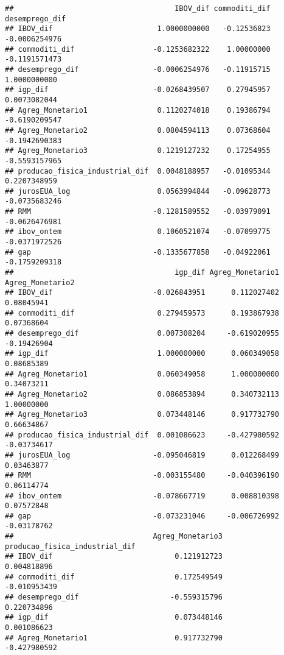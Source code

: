 \documentclass[
]{article}
\begin{document}
\begin{verbatim}
##                                     IBOV_dif commoditi_dif desemprego_dif
## IBOV_dif                        1.0000000000   -0.12536823  -0.0006254976
## commoditi_dif                  -0.1253682322    1.00000000  -0.1191571473
## desemprego_dif                 -0.0006254976   -0.11915715   1.0000000000
## igp_dif                        -0.0268439507    0.27945957   0.0073082044
## Agreg_Monetario1                0.1120274018    0.19386794  -0.6190209547
## Agreg_Monetario2                0.0804594113    0.07368604  -0.1942690383
## Agreg_Monetario3                0.1219127232    0.17254955  -0.5593157965
## producao_fisica_industrial_dif  0.0048188957   -0.01095344   0.2207348959
## jurosEUA_log                    0.0563994844   -0.09628773  -0.0735683246
## RMM                            -0.1281589552   -0.03979091  -0.0626476981
## ibov_ontem                      0.1060521074   -0.07099775  -0.0371972526
## gap                            -0.1335677858   -0.04922061  -0.1759209318
##                                     igp_dif Agreg_Monetario1 Agreg_Monetario2
## IBOV_dif                       -0.026843951      0.112027402       0.08045941
## commoditi_dif                   0.279459573      0.193867938       0.07368604
## desemprego_dif                  0.007308204     -0.619020955      -0.19426904
## igp_dif                         1.000000000      0.060349058       0.08685389
## Agreg_Monetario1                0.060349058      1.000000000       0.34073211
## Agreg_Monetario2                0.086853894      0.340732113       1.00000000
## Agreg_Monetario3                0.073448146      0.917732790       0.66634867
## producao_fisica_industrial_dif  0.001086623     -0.427980592      -0.03734617
## jurosEUA_log                   -0.095046819      0.012268499       0.03463877
## RMM                            -0.003155480     -0.040396190       0.06114774
## ibov_ontem                     -0.078667719      0.008810398       0.07572848
## gap                            -0.073231046     -0.006726992      -0.03178762
##                                Agreg_Monetario3 producao_fisica_industrial_dif
## IBOV_dif                            0.121912723                    0.004818896
## commoditi_dif                       0.172549549                   -0.010953439
## desemprego_dif                     -0.559315796                    0.220734896
## igp_dif                             0.073448146                    0.001086623
## Agreg_Monetario1                    0.917732790                   -0.427980592

\end{verbatim}
\end{document}
